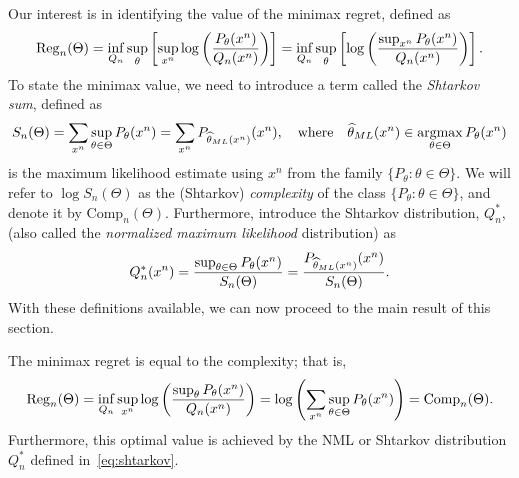 \documentclass[12pt]{article}
\begin{document}
Our interest is in identifying the value of the minimax regret, defined as 
\begin{align}
    \mathrm{Reg}_n(\Theta) = \inf_{Q_n} \sup_{\theta} \left[ \sup_{x^n} \log \left(\frac{P_\theta(x^n)}{Q_n(x^n)} \right) \right] = \inf_{Q_n} \sup_{\theta} \left[  \log \left(\frac{\sup_{x^n} P_\theta(x^n)}{Q_n(x^n)} \right) \right]. 
\end{align}
To state the minimax value, we need to introduce a term called the \emph{Shtarkov sum}, defined as 
\begin{align}
    S_n(\Theta) = \sum_{x^n} \sup_{\theta \in \Theta} P_\theta(x^n) = \sum_{x^n}  P_{\widehat{\theta}_{ML}(x^n)}(x^n), \quad \text{where} \quad \widehat{\theta}_{ML}(x^n) \in \operatorname*{argmax}_{\theta \in \Theta} P_\theta(x^n) 
\end{align}
is the maximum likelihood estimate using $x^n$ from the family $\{P_\theta: \theta \in \Theta\}$. We will refer to $\log S_n(\Theta)$ as the (Shtarkov) \emph{complexity} of the class $\{P_\theta: \theta \in \Theta\}$, and denote it by $\mathrm{Comp}_n(\Theta)$. Furthermore, introduce the Shtarkov distribution, $Q^*_n$, (also called the \emph{normalized maximum likelihood} distribution) as 
\begin{align}
    Q^*_n(x^n) = \frac{\sup_{\theta \in \Theta} P_\theta(x^n)}{S_n(\Theta)} = \frac{P_{\widehat{\theta}_{ML}(x^n)}(x^n)}{S_n(\Theta)}. \label{eq:shtarkov}
\end{align}
With these definitions available, we can now proceed to the main result of this section. 
\begin{theorem}
    \label{theorem:regret-complexity} The minimax regret is equal to the complexity; that is, 
    \begin{align}
        \mathrm{Reg}_n(\Theta) = \inf_{Q_n} \sup_{x^n} \log \left( \frac{\sup_\theta P_\theta(x^n)}{Q_n(x^n)} \right) = \log \left( \sum_{x^n} \sup_{\theta \in\Theta} P_\theta(x^n) \right) = \mathrm{Comp}_n(\Theta). 
    \end{align}
    Furthermore, this optimal value is achieved by the NML or Shtarkov distribution $Q^*_n$ defined in~\eqref{eq:shtarkov}. 
\end{theorem}
\end{document}
